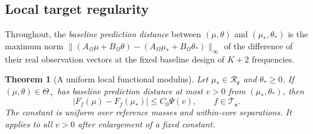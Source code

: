 \documentclass[10pt]{amsart}
\newtheorem{theorem}{Theorem}[section]
\theoremstyle{definition}
\theoremstyle{remark}
\theoremstyle{plain}
\newcommand{\ThetaAll}{\Theta_+}
\newcommand{\Tclass}{\mathcal T_{\boldsymbol s}}
\newcommand{\Rclass}{\mathcal R_{\boldsymbol r}}
\begin{document}
\subsection{Local target regularity}
Throughout, the \emph{baseline prediction distance} between $(\mu,\theta)$ and $(\mu_*,\theta_*)$ is the maximum norm $\|(A_\Omega\mu+B_\Omega\theta)-(A_\Omega\mu_*+B_\Omega\theta_*)\|_\infty$ of the difference of their real observation vectors at the fixed baseline design of $K+2$ frequencies.
\begin{theorem}[A uniform local functional modulus]\label{thm:modulus}
Let $\mu_*\in\Rclass$ and $\theta_*\ge0$. If $(\mu,\theta)\in\ThetaAll$ has baseline prediction distance at most $v>0$ from $(\mu_*,\theta_*)$, then
\begin{equation}\label{eq:modulus}
 |F_f(\mu)-F_f(\mu_*)|\le C_0\Psi(v),\qquad f\in\Tclass.
\end{equation}
The constant is uniform over reference masses and within-core separations. It applies to all $v>0$ after enlargement of a fixed constant.
\end{theorem}
\end{document}
